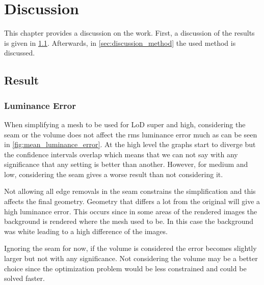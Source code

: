 
\chapter{Discussion} \label{cha:discussion}
This chapter provides a discussion on the work. First, a discussion of the results is given in \cref{sec:discussion_result}. Afterwards, in \cref{sec:discussion_method} the used method is discussed.

\section{Result} \label{sec:discussion_result}


\subsection{Luminance Error} \label{sec:discussion_luminance}
When simplifying a mesh to be used for LoD super and high, considering the seam or the volume does not affect the rms luminance error much as can be seen in \cref{fig:mean_luminance_error}. At the high level the graphs start to diverge but the confidence intervals overlap which means that we can not say with any significance that any setting is better than another. However, for medium and low, considering the seam gives a worse result than not considering it.

Not allowing all edge removals in the seam constrains the simplification and this affects the final geometry. Geometry that differs a lot from the original will give a high luminance error. This occurs since in some areas of the rendered images the background is rendered where the mesh used to be. In this case the background was white leading to a high difference of the images.

Ignoring the seam for now, if the volume is considered the error becomes slightly larger but not with any significance. Not considering the volume may be a better choice since the optimization problem would be less constrained and could be solved faster.

